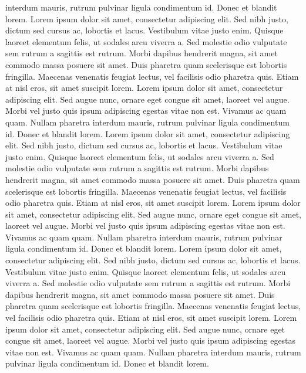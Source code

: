                                                     interdum mauris, rutrum pulvinar ligula condimentum id. Donec et blandit lorem. Lorem ipsum dolor sit amet, consectetur adipiscing elit. Sed nibh justo, dictum sed cursus ac, lobortis et lacus. Vestibulum vitae justo enim. Quisque laoreet elementum felis, ut sodales arcu viverra a. Sed molestie odio vulputate sem rutrum a sagittis est rutrum. Morbi dapibus hendrerit magna, sit amet commodo massa posuere sit amet. Duis pharetra quam scelerisque est lobortis fringilla. Maecenas venenatis feugiat lectus, vel facilisis odio pharetra quis. Etiam at nisl eros, sit amet suscipit lorem. Lorem ipsum dolor sit amet, consectetur adipiscing elit. Sed augue nunc, ornare eget congue sit amet, laoreet vel augue. Morbi vel justo quis ipsum adipiscing egestas vitae non est. Vivamus ac quam quam. Nullam pharetra
                                                    interdum mauris, rutrum pulvinar ligula condimentum id. Donec et blandit lorem. Lorem ipsum dolor sit amet, consectetur adipiscing elit. Sed nibh justo, dictum sed cursus ac, lobortis et lacus. Vestibulum vitae justo enim. Quisque laoreet elementum felis, ut sodales arcu viverra a. Sed molestie odio vulputate sem rutrum a sagittis est rutrum. Morbi dapibus hendrerit magna, sit amet commodo massa posuere sit amet. Duis pharetra quam scelerisque est lobortis fringilla. Maecenas venenatis feugiat lectus, vel facilisis odio pharetra quis. Etiam at nisl eros, sit amet suscipit lorem. Lorem ipsum dolor sit amet, consectetur adipiscing elit. Sed augue nunc, ornare eget congue sit amet, laoreet vel augue. Morbi vel justo quis ipsum adipiscing egestas vitae non est. Vivamus ac quam quam. Nullam pharetra
                                                    interdum mauris, rutrum pulvinar ligula condimentum id. Donec et blandit lorem. Lorem ipsum dolor sit amet, consectetur adipiscing elit. Sed nibh justo, dictum sed cursus ac, lobortis et lacus. Vestibulum vitae justo enim. Quisque laoreet elementum felis, ut sodales arcu viverra a. Sed molestie odio vulputate sem rutrum a sagittis est rutrum. Morbi dapibus hendrerit magna, sit amet commodo massa posuere sit amet. Duis pharetra quam scelerisque est lobortis fringilla. Maecenas venenatis feugiat lectus, vel facilisis odio pharetra quis. Etiam at nisl eros, sit amet suscipit lorem. Lorem ipsum dolor sit amet, consectetur adipiscing elit. Sed augue nunc, ornare eget congue sit amet, laoreet vel augue. Morbi vel justo quis ipsum adipiscing egestas vitae non est. Vivamus ac quam quam. Nullam pharetra
                                                    interdum mauris, rutrum pulvinar ligula condimentum id. Donec et blandit lorem.        